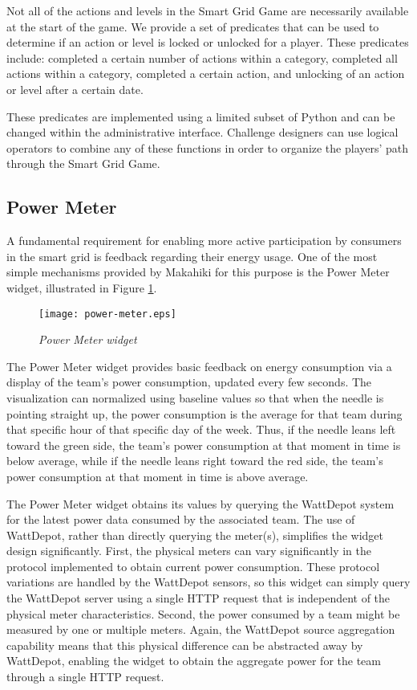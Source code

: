 Not all of the actions and levels in the Smart Grid Game are necessarily available at
the start of the game. We provide a set of predicates that can be used to determine if an action or level is locked or unlocked for a player. These predicates include: completed a certain number of actions within a category, completed all actions within a category, completed  a certain action, and unlocking of an action or level after a certain date.

These predicates are implemented using a limited subset of Python and can
be changed within the administrative interface. Challenge designers can use
logical operators to combine any of these functions in order to organize
the players' path through the Smart Grid Game.

\subsection{Power Meter}

A fundamental requirement for enabling more active participation by consumers in the smart grid is feedback regarding their energy usage.  One of the most simple mechanisms provided by Makahiki for this purpose is the Power Meter widget, illustrated in Figure \ref{fig:PowerMeter}.

\begin{figure}[th]
  \center
  \texttt{[image: power-meter.eps]}
  \caption{\em Power Meter widget}
  \label{fig:PowerMeter}
\end{figure}

The Power Meter widget provides basic feedback on energy consumption via a display of the team's power consumption, updated every few seconds.  The visualization can normalized using baseline values so that when the needle is pointing straight up, the power consumption is the average for that team during that specific hour of that specific day of the week.  Thus, if the needle leans left toward the green side, the team's power consumption at that moment in time is below average, while if the needle leans right toward the red side, the team's power consumption at that moment in time is above average.

The Power Meter widget obtains its values by querying the WattDepot system for the latest power data consumed by the associated team.  The use of WattDepot, rather than directly querying the meter(s), simplifies the widget design significantly.  First, the physical meters can vary significantly in the protocol implemented to obtain current power consumption.   These protocol variations are handled by the WattDepot sensors, so this widget can simply query the WattDepot server using a single HTTP request that is independent of the physical meter characteristics.  Second, the power consumed by a team might be measured by one or multiple meters.  Again, the WattDepot source aggregation capability means that this physical difference can be abstracted away by WattDepot, enabling the widget to obtain the aggregate power for the team through a single HTTP request.

